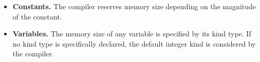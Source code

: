 %
%
%
%
%
% 
%    
    
\begin{IN}
    \begin{itemize} 
    \item  \textbf{Constants.}
    The compiler reserves memory size depending on the magnitude of the constant. 
    \item  \textbf{Variables.}
    The memory size of any variable is specified by its kind type. 
    If no kind type is specifically declared, the default integer kind is considered by the compiler. 
   
    \end{itemize} 
\end{IN}

%
%
%
%
%
%




